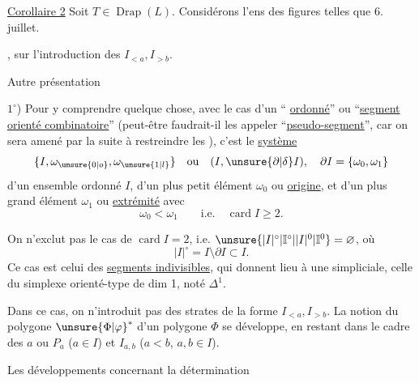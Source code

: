 \uline{Corollaire 2}  Soit $T\in\operatorname{Drap}(L)$. Considérons l'ens des figures telles que
6. juillet.

, sur l'introduction des $I_{<a},I_{>b}$.

Autre présentation

$1^\circ$) Pour y comprendre quelque chose,  avec le cas d'un `` \uline{ordonné}'' ou ``\uline{segment orienté combinatoire}'' (peut-être faudrait-il les appeler ``\uline{pseudo-segment}'', car on sera amené par la suite à restreindre les ), c'est le \uline{système}
\[
\{I,\omega_{\unsure{0|o}},\omega_{\unsure{1|l}}\}\quad\text{ou}\quad(I,\unsure{\partial|\delta}I),\quad\partial I=\{\omega_0,\omega_1\}
\]
d'un ensemble ordonné $I$, d'un plus petit élément $\omega_0$ ou \uline{origine}, et d'un plus grand élément $\omega_1$ ou \uline{extrémité} avec
\[
\omega_0<\omega_1\qquad\text{i.e.}\quad\operatorname{card}I\geq2.
\]

On n'exclut pas le cas de $\operatorname{card}I=2$, i.e. $\unsure{\lvert I\rvert^{\circ}|\mathbb I^{\circ}|\lvert I\rvert^0|\mathbb I^0}=\varnothing$, où
\[
\lvert I\rvert^{\circ}=I\setminus\partial I\subset I.
\]
Ce cas est celui des \uline{segments indivisibles}, qui donnent lieu à une     simpliciale,  celle du simplexe orienté-type de dim 1, noté $\Delta^1$.

Dans ce cas, on n'introduit pas des strates de la forme $I_{<a},I_{>b}$. La notion du polygone  ${\unsure{\Phi|\varphi}}^*$ d'un polygone $\Phi$ se développe, en restant dans le cadre des $a$ ou $P_a$ ($a\in I$) et $I_{a,b}$ ($a<b$, $a,b\in I$).

Les développements concernant la détermination
